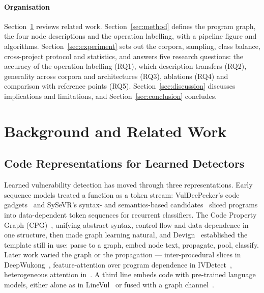 \documentclass[pdflatex,sn-basic]{sn-jnl}
\theoremstyle{thmstyleone}%
\begin{document}
\paragraph{Organisation} Section~\ref{sec:background} reviews related work.
Section~\ref{sec:method} defines the program graph, the four node descriptions
and the operation labelling, with a pipeline figure and algorithms.
Section~\ref{sec:experiment} sets out the corpora, sampling, class balance,
cross-project protocol and statistics, and answers five research questions:
the accuracy of the operation labelling (RQ1), which description transfers
(RQ2), generality across corpora and architectures (RQ3), ablations (RQ4) and
comparison with reference points (RQ5). Section~\ref{sec:discussion} discusses
implications and limitations, and Section~\ref{sec:conclusion} concludes.


\section{Background and Related Work}
\label{sec:background}

\subsection{Code Representations for Learned Detectors}
Learned vulnerability detection has moved through three representations. Early
sequence models treated a function as a token stream: VulDeePecker's code
gadgets~\citep{li2018vuldeepecker} and SySeVR's syntax- and semantics-based
candidates~\citep{li2022sysevr} sliced programs into data-dependent token
sequences for recurrent classifiers. The Code Property Graph
(CPG)~\citep{yamaguchi2014modeling}, unifying abstract syntax, control flow and
data dependence in one structure, then made graph learning natural, and
Devign~\citep{zhou2019devign} established the template still in use: parse to a
graph, embed node text, propagate, pool, classify. Later work varied the
graph or the propagation --- inter-procedural slices in
DeepWukong~\citep{cheng2021deepwukong}, feature-attention over program
dependence in IVDetect~\citep{li2021ivdetect}, heterogeneous attention
in~\citep{luo2025hagnn}. A third line embeds code with pre-trained language
models, either alone as in LineVul~\citep{fu2022linevul} or fused with a graph
channel~\citep{hin2022linevd, sun2024vullmgnns}.
\end{document}
